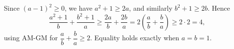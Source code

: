 Since $(a-1)^2\ge0$, we have $a^2+1\ge2a$, and similarly $b^2+1\ge2b$. Hence
\[
\dfrac{a^2+1}{b}+\dfrac{b^2+1}{a}\ge\dfrac{2a}{b}+\dfrac{2b}{a}=2\left(\dfrac {a}{b}+\dfrac {b}{a}\right)\ge2\cdot2=4,
\]
using AM-GM for $\dfrac {a}{b}+\dfrac {b}{a}\ge2$. Equality holds exactly when $a=b=1$.
